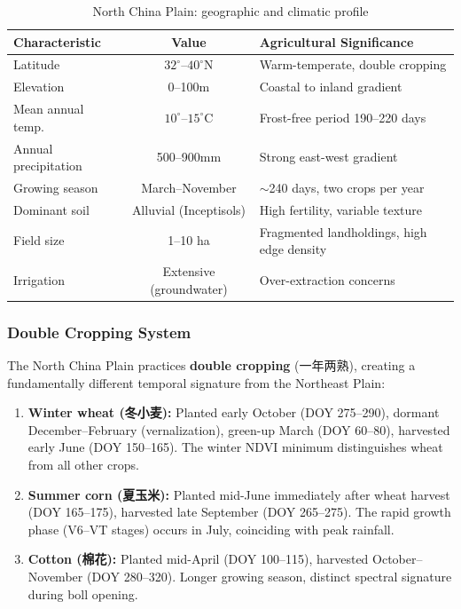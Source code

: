 \begin{table}[h]
\centering
\caption{North China Plain: geographic and climatic profile}
\begin{tabular}{lcl}
\toprule
\textbf{Characteristic} & \textbf{Value} & \textbf{Agricultural Significance} \\
\midrule
Latitude & $32^\circ$--$40^\circ$N & Warm-temperate, double cropping \\
Elevation & 0--100m & Coastal to inland gradient \\
Mean annual temp. & $10^\circ$--$15^\circ$C & Frost-free period 190--220 days \\
Annual precipitation & 500--900mm & Strong east-west gradient \\
Growing season & March--November & $\sim$240 days, two crops per year \\
Dominant soil & Alluvial (Inceptisols) & High fertility, variable texture \\
Field size & 1--10 ha & Fragmented landholdings, high edge density \\
Irrigation & Extensive (groundwater) & Over-extraction concerns \\
\bottomrule
\end{tabular}
\end{table}

\subsubsection{Double Cropping System}

The North China Plain practices \textbf{double cropping} (一年两熟), creating
a fundamentally different temporal signature from the Northeast Plain:

\begin{enumerate}[nosep]
    \item \textbf{Winter wheat (冬小麦):} Planted early October (DOY 275--290),
    dormant December--February (vernalization), green-up March (DOY 60--80),
    harvested early June (DOY 150--165). The winter NDVI minimum distinguishes
    wheat from all other crops.

    \item \textbf{Summer corn (夏玉米):} Planted mid-June immediately after wheat
    harvest (DOY 165--175), harvested late September (DOY 265--275). The rapid
    growth phase (V6--VT stages) occurs in July, coinciding with peak rainfall.

    \item \textbf{Cotton (棉花):} Planted mid-April (DOY 100--115), harvested
    October--November (DOY 280--320). Longer growing season, distinct spectral
    signature during boll opening.
\end{enumerate}

